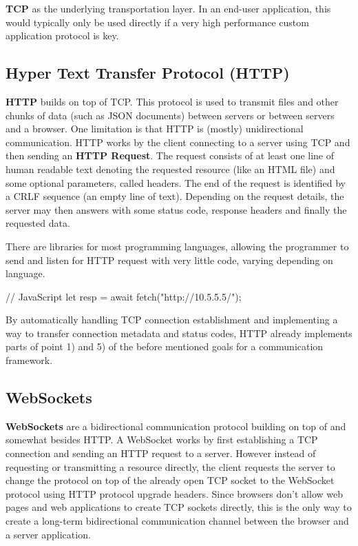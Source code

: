 \documentclass[conference]{IEEEtran}
\begin{document}
\textbf{TCP} as the underlying transportation layer. In an end-user application, this would typically only be used directly if a very high performance custom application protocol is key.


\subsection{Hyper Text Transfer Protocol (HTTP)}

\textbf{HTTP} builds on top of TCP. This protocol is used to transmit files and other chunks of data (such as JSON documents) between servers or between servers and a browser. One limitation is that HTTP is (mostly) unidirectional communication. HTTP works by the client connecting to a server using TCP and then sending an \textbf{HTTP Request}. The request consists of at least one line of human readable text denoting the requested resource (like an HTML file) and some optional parameters, called headers. The end of the request is identified by a CRLF sequence (an empty line of text). Depending on the request details, the server may then answers with some status code, response headers and finally the requested data.

There are libraries for most programming languages, allowing the programmer to send and listen for HTTP request with very little code, varying depending on language.

\begin{code-js}
// JavaScript
let resp = await fetch("http://10.5.5.5/");
\end{code-js}

By automatically handling TCP connection establishment and implementing a way to transfer connection metadata and status codes, HTTP already implements parts of point 1) and 5) of the before mentioned goals for a communication framework.


\subsection{WebSockets}

\textbf{WebSockets} are a bidirectional communication protocol building on top of and somewhat besides HTTP. A WebSocket works by first establishing a TCP connection and sending an HTTP request to a server. However instead of requesting or transmitting a resource directly, the client requests the server to change the protocol on top of the already open TCP socket to the WebSocket protocol using HTTP protocol upgrade headers. Since browsers don't allow web pages and web applications to create TCP sockets directly, this is the only way to create a long-term bidirectional communication channel between the browser and a server application. 
\end{document}
